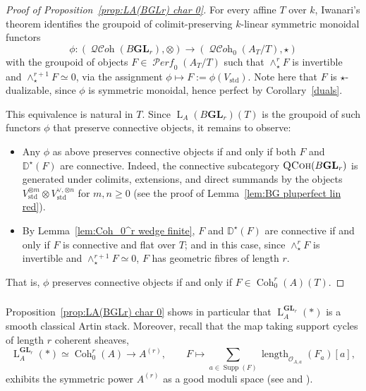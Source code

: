 \documentclass[12pt, oneside]{amsart}
\numberwithin{equation}{section}
\theoremstyle{remark}
\theoremstyle{plain}
\renewcommand{\geq}{\geqslant}
\DeclareMathOperator{\QCoh}{\textsc{QCoh}}
\DeclareMathOperator{\QCOH}{\mathcal{QC}\textit{oh}}
\DeclareMathOperator{\PERF}{\mathcal{P}\textit{erf}}
\newcommand{\Loop}{\operatorname{L}}
\newcommand{\OO}{\mathcal{O}}
\newcommand{\GL}{\mathbf{GL}}
\begin{document}
\begin{proof}[Proof of Proposition~\ref{prop:LA(BGLr) char 0}]
For every affine $T$ over $k$, Iwanari's theorem \cite[Thm.~1.7]{Iwa} identifies the groupoid of colimit-preserving $k$-linear symmetric monoidal functors
\[
  \phi : (\QCOH(B\GL_r), \otimes) \to (\QCOH_0(A_T/T), \star)
\]
with the groupoid of objects $F \in \PERF_0(A_T/T)$ such that $\wedge_\star^r F$ is invertible and $\wedge_\star^{r+1}F\simeq 0$, via the assignment $\phi \mapsto F := \phi(V_{\mathrm{std}})$.
Note here that $F$ is $\star$-dualizable, since $\phi$ is symmetric monoidal, hence perfect by Corollary~\ref{duals}.

This equivalence is natural in $T$.
Since $\Loop_A(B\GL_r)(T)$ is the groupoid of such functors $\phi$ that preserve connective objects, it remains to observe:
\begin{itemize}
\item Any $\phi$ as above preserves connective objects if and only if both $F$ and $\mathbb{D}^\star(F)$ are connective.
Indeed, the connective subcategory $\QCoh(B\GL_r)$ is generated under colimits, extensions, and direct summands by the objects $V_{\mathrm{std}}^{\otimes m} \otimes V_{\mathrm{std}}^{\vee,\otimes n}$ for $m,n \geq 0$ (see the proof of Lemma~\ref{lem:BG pluperfect lin red}).

\item By Lemma~\ref{lem:Coh_0^r wedge finite}, $F$ and $\mathbb{D}^\star(F)$ are connective if and only if $F$ is connective and flat over $T$; and in this case, since $\wedge_\star^r F$ is invertible and $\wedge_\star^{r+1}F\simeq 0$, $F$ has geometric fibres of length $r$.
\end{itemize}
That is, $\phi$ preserves connective objects if and only if $F\in \operatorname{Coh}_0^r(A)(T)$.
\end{proof}

\subsubsection{}

Proposition~\ref{prop:LA(BGLr) char 0} shows in particular that $\Loop_A^{\GL_r}(*)$ is a smooth classical Artin stack.
Moreover, recall that the map taking support cycles of length $r$ coherent sheaves,
\[
  \Loop_A^{\GL_r}(*) \simeq \operatorname{Coh}_0^r(A) \to A^{(r)},
  \qquad
  F \mapsto \sum_{a\in\operatorname{Supp}(F)} \operatorname{length}_{\OO_{A,a}}(F_a)[a],
\]
exhibits the symmetric power $A^{(r)}$ as a good moduli space (see \cite[Ex.~4.3.6]{HuybrechtsLehn} and \cite[Ex.~8.7]{Alper}).
\end{document}

